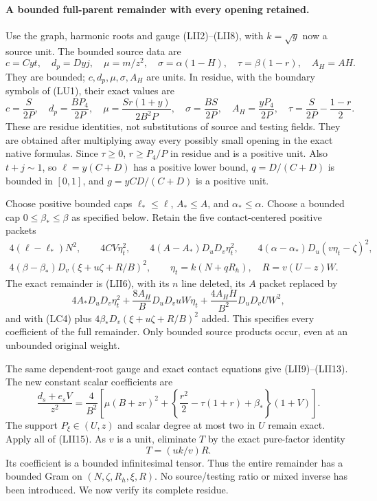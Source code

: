 \paragraph{A bounded full-parent remainder with every opening retained.}
Use the graph, harmonic roots and gauge (LII2)--(LII8), with
$k=\sqrt y$ now a source unit.  The bounded source data are
\[
 c=Cyt,\quad d_p=Dyj,\quad
 \mu=m/z^2,\quad \sigma=\alpha(1-H),\quad
 \tau=\beta(1-r),\quad A_H=AH.
\]
They are bounded; $c,d_p,\mu,\sigma,A_H$ are units.  In residue,
with the boundary symbols of (LU1), their exact values are
\[
 c=\frac S{2P},\quad d_p=\frac{BP_4}{2P},\quad
 \mu=\frac{Sr(1+y)}{2B^2P},\quad
 \sigma=\frac{BS}{2P},\quad A_H=\frac{yP_4}{2P},\quad
 \tau=\frac S{2P}-\frac{1-r}{2}.                         \tag{LU3}
\]
These are residue identities, not substitutions of source and
testing fields.  They are obtained after multiplying away every
possibly small opening in the exact native formulas.
Since $\tau\ge0$, $r\ge P_4/P$ in residue and is a positive unit.
Also $t+j\sim1$, so $\ell=y(C+D)$ has a positive lower bound,
$q=D/(C+D)$ is bounded in $[0,1]$, and
$g=yCD/(C+D)$ is a positive unit.

Choose positive bounded caps $\ell_*\le\ell$,
$A_*\le A$, and $\alpha_*\le\alpha$.  Choose a bounded cap
$0\le\beta_*\le\beta$ as specified below.  Retain the five
contact-centered positive packets
\[
\begin{gathered}
 4(\ell-\ell_*)N^2,\qquad 4CV\eta_t^2,\qquad
 4(A-A_*)D_uD_v\eta_t^2,\qquad
 4(\alpha-\alpha_*)D_u(v\eta_t-\zeta)^2,\\
 4(\beta-\beta_*)D_v(\xi+u\zeta+R/B)^2,
 \qquad \eta_t=k(N+qR_h),\quad R=v(U-z)W.
                                                               \tag{LU4}
\end{gathered}
\]
The exact remainder is (LII6), with its $n$ line deleted, its $A$
packet replaced by
\[
 4A_*D_uD_v\eta_t^2
 +\frac{8A_H}B D_uD_vuW\eta_t
 +\frac{4A_HH}{B^2}D_uD_vUW^2,
                                                               \tag{LU5}
\]
and with (LC4) plus $4\beta_*D_v(\xi+u\zeta+R/B)^2$ added.
This specifies every coefficient of the full remainder.  Only
bounded source products occur, even at an unbounded original weight.

The same dependent-root gauge and exact contact equations give
(LII9)--(LII13).  The new constant scalar coefficients are
\[
 \frac{d_s+e_sV}{z^2}=
 \frac4{B^2}\left[
 \mu(B+zr)^2+
 \left\{\frac{r^2}{2}-\tau(1+r)+\beta_*\right\}(1+V)
 \right].                                                   \tag{LU6}
\]
The support $P_\xi\in(U,z)$ and scalar degree at most two in $U$
remain exact.  Apply all of (LII15).  As $v$ is a unit, eliminate
$T$ by the exact pure-factor identity
\[
                        T=(uk/v)R.                         \tag{LU7}
\]
Its coefficient is a bounded infinitesimal tensor.  Thus the entire
remainder has a bounded Gram on
$(N,\zeta,R_h,\xi,R)$.  No source/testing ratio or mixed inverse
has been introduced.  We now verify its complete residue.

